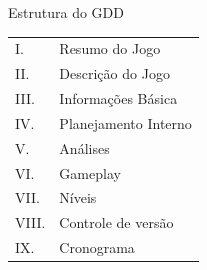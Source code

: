 \begin{quadro}[ht]
    \caption{Estrutura do GDD}
    \label{quad:gdd}
    \centering
    \begin{tabular}{|ll|}
        \cline{1-2}
        I.      & Resumo do Jogo            \\
        II.     & Descrição do Jogo         \\
        III.    & Informações Básica        \\
        IV.     & Planejamento Interno      \\
        V.      & Análises                  \\
        VI.     & Gameplay                  \\
        VII.    & Níveis                    \\
        VIII.   & Controle de versão        \\
        IX.     & Cronograma                \\
        \cline{1-2}
    \end{tabular}
    
\end{quadro}

\vspace{2cm}

